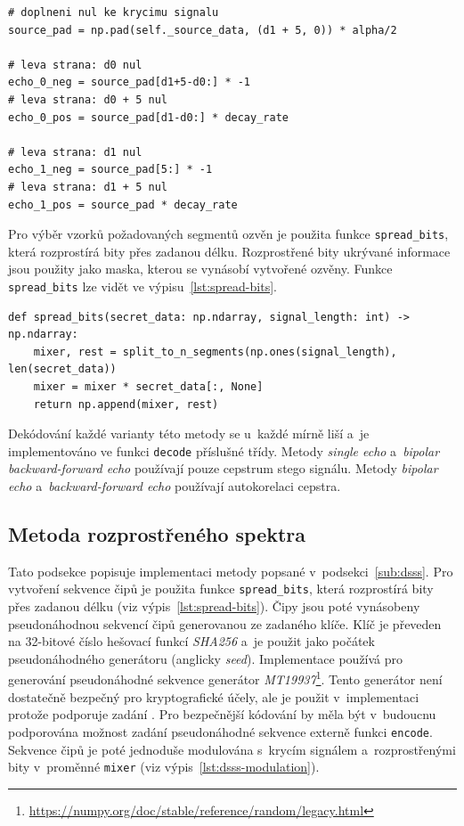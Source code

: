 \begin{lstlisting}[language=PythonPlus, label={lst:echo-source-padding},
caption={Vytvoření pouze jedné kopie krycího signálu a~přiřazení jednotlivých
ozvěn jako výřezy.}]
# doplneni nul ke krycimu signalu
source_pad = np.pad(self._source_data, (d1 + 5, 0)) * alpha/2

# leva strana: d0 nul
echo_0_neg = source_pad[d1+5-d0:] * -1
# leva strana: d0 + 5 nul
echo_0_pos = source_pad[d1-d0:] * decay_rate

# leva strana: d1 nul
echo_1_neg = source_pad[5:] * -1
# leva strana: d1 + 5 nul
echo_1_pos = source_pad * decay_rate
\end{lstlisting}

Pro výběr vzorků požadovaných segmentů ozvěn je použita funkce
\texttt{spread\_bits}, která rozprostírá bity přes zadanou délku. Rozprostřené
bity ukrývané informace jsou použity jako maska, kterou se vynásobí vytvořené
ozvěny. Funkce \texttt{spread\_bits} lze vidět ve výpisu~\ref{lst:spread-bits}.

\begin{lstlisting}[language=PythonPlus, label={lst:spread-bits},
caption={Funkce pro rozprostření bitů na zadanou délku.}]
def spread_bits(secret_data: np.ndarray, signal_length: int) -> np.ndarray:
    mixer, rest = split_to_n_segments(np.ones(signal_length), len(secret_data))
    mixer = mixer * secret_data[:, None]
    return np.append(mixer, rest)
\end{lstlisting}

Dekódování každé varianty této metody se u~každé mírně liší a~je implementováno
ve funkci \texttt{decode} příslušné třídy. Metody \textit{single echo}
a~\textit{bipolar backward-forward echo} používají pouze cepstrum stego
signálu. Metody \textit{bipolar echo} a~\textit{backward-forward echo}
používají autokorelaci cepstra.

\subsection*{Metoda rozprostřeného spektra}
\label{sub:dsss-implementation}

Tato podsekce popisuje implementaci metody popsané v~podsekci~\ref{sub:dsss}.
Pro vytvoření sekvence čipů je použita funkce \texttt{spread\_bits}, která
rozprostírá bity přes zadanou délku (viz výpis~\ref{lst:spread-bits}). Čipy
jsou poté vynásobeny pseudonáhodnou sekvencí čipů generovanou ze zadaného
klíče. Klíč je převeden na 32-bitové číslo hešovací funkcí \textit{SHA256} a~je
použit jako počátek pseudonáhodného generátoru (anglicky \textit{seed}).
Implementace používá pro generování pseudonáhodné sekvence generátor
\textit{MT19937}\footnote{\url{https://numpy.org/doc/stable/reference/random/legacy.html}}.
Tento generátor není dostatečně bezpečný pro kryptografické účely, ale je
použit v~implementaci protože podporuje zadání . Pro bezpečnější
kódování by měla být v~budoucnu podporována možnost zadání pseudonáhodné
sekvence externě funkci \texttt{encode}. Sekvence čipů je poté jednoduše
modulována s~krycím signálem a~rozprostřenými bity v~proměnné \texttt{mixer}
(viz výpis~\ref{lst:dsss-modulation}).

